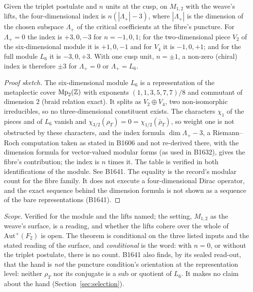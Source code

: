 \begin{proposition}\label{thm:index}
Given the triplet postulate and $n$ units at the cusp, on $M_{1,2}$ with the weave's lifts, the four-dimensional index
is $n(|\Lambda_+|-3)$, where $|\Lambda_+|$ is the dimension of the chosen subspace $\Lambda_+$ of the critical coefficients at the fibre's puncture. For
$\Lambda_+=0$ the index is $+3,0,-3$ for $n=-1,0,1$; for the two-dimensional piece $V_2$ of the six-dimensional module it
is $+1,0,-1$ and for $V_4$ it is $-1,0,+1$; and for the full module $L_6$ it is $-3,0,+3$. With one cusp unit, $n=\pm1$,
a non-zero (chiral) index is therefore $\pm3$ for $\Lambda_+=0$ or $\Lambda_+=L_6$.
\end{proposition}
\begin{proof}[Proof sketch]
The six-dimensional module $L_6$ is a representation of the metaplectic cover $\mathrm{Mp}_2(\mathbb{Z})$ with exponents
$(1,1,3,5,7,7)/8$ and commutant of dimension $2$ (braid relation exact). It splits as $V_2\oplus V_4$, two non-isomorphic
irreducibles, so no three-dimensional constituent exists. The characters $\chi_1$ of the pieces and of $L_6$ vanish and
$\chi_{3/2}(\rho_T)=0=\chi_{1/2}(\bar\rho_T)$, so weight one is not obstructed by these characters, and the index formula $\dim\Lambda_+-3$, a Riemann--Roch computation taken as stated in B1606 and not re-derived there,
with the dimension formula for vector-valued modular forms (as used in B1632), gives the fibre's contribution; the index
is $n$ times it. The table is verified in both identifications of the module.
See B1641. The equality is the record's modular count for the fibre family. It does not execute a four-dimensional Dirac operator, and the exact sequence behind the dimension formula is not shown as a sequence of the bare representations (B1641).
\end{proof}
\noindent\emph{Scope.} Verified for the module and the lifts named; the setting, $M_{1,2}$ as the weave's surface, is a
reading, and whether the lifts cohere over the whole of $\mathrm{Aut}^+(F_2)$ is open. The theorem is conditional on the three listed inputs and the stated reading of the surface, and \emph{conditional} is the word: with $n=0$, or without the triplet
postulate, there is no count. B1641 also finds, by its sealed read-out, that the hand is \emph{not} the puncture
condition's orientation at the representation level: neither $\rho_T$ nor its conjugate is a sub or quotient of $L_6$. It
makes no claim about the hand (Section~\ref{sec:selection}).

